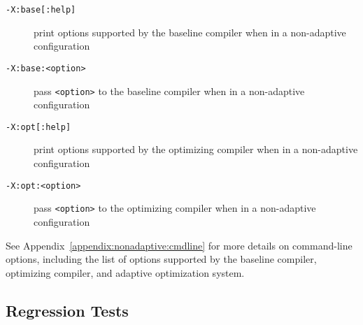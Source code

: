 \begin{description}
\item[{\tt -X:base[:help]}]
print options supported by the baseline compiler when in a 
non-adaptive configuration

\item[{\tt -X:base:<option>}]
pass {\tt <option>} to the baseline compiler when in a non-adaptive configuration

\item[{\tt -X:opt[:help]}]
print options supported by the optimizing compiler when in a 
non-adaptive configuration

\item[{\tt -X:opt:<option>}]
pass {\tt <option>} to the optimizing compiler when in a non-adaptive configuration

\end{description}

See Appendix~\ref{appendix:nonadaptive:cmdline} for more details on 
command-line options, including the list of options supported by the 
baseline compiler, optimizing compiler, and adaptive optimization system.

\JikesTMFooter

\JavaTMFooter

\subsection{Regression Tests}

